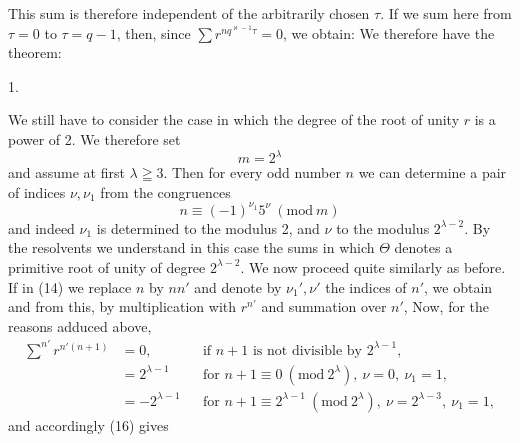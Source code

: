 This sum is therefore independent of the arbitrarily chosen $\tau$. If we sum here from $\tau=0$ to $\tau=q-1$, then, since $\sum r^{n q^{\varkappa-1}\tau}=0$, we obtain:
We therefore have the theorem:

1.~

We still have to consider the case in which the degree of the root of unity $r$ is a power of 2. We therefore set
\[
m = 2^\lambda
\]
and assume at first $\lambda \geqq 3$. Then for every odd number $n$ we can determine a pair of indices $\nu, \nu_1$ from the congruences
\[
n \equiv (-1)^{\nu_1} 5^\nu\ (\mathrm{mod}\ m)
\]
and indeed $\nu_1$ is determined to the modulus 2, and $\nu$ to the modulus $2^{\lambda-2}$. By the resolvents we understand in this case the sums
in which $\Theta$ denotes a primitive root of unity of degree $2^{\lambda-2}$. We now proceed quite similarly as before. If in (14) we replace $n$ by $nn'$ and denote by $\nu_1', \nu'$ the indices of $n'$, we obtain
and from this, by multiplication with $r^{n'}$ and summation over $n'$,
Now, for the reasons adduced above,
\[
\begin{aligned}
\sum^{n'} r^{n'(n+1)} &= 0, & &\text{if } n+1 \text{ is not divisible by } 2^{\lambda-1}\text{,} \\
&= 2^{\lambda-1} & &\text{for } n+1 \equiv 0\ (\mathrm{mod}\ 2^\lambda),\ \nu=0,\ \nu_1=1, \\
&= -2^{\lambda-1} & &\text{for } n+1 \equiv 2^{\lambda-1}\ (\mathrm{mod}\ 2^\lambda),\ \nu=2^{\lambda-3},\ \nu_1=1,
\end{aligned}
\]
and accordingly (16) gives
